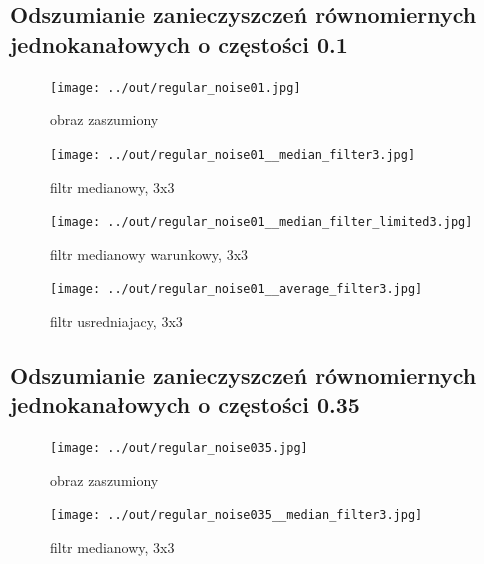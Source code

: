 \documentclass[a4paper,12pt]{article}
\begin{document}
\subsection{Odszumianie zanieczyszczeń równomiernych jednokanałowych o częstości 0.1}
\begin{figure}[h!]
\begin{minipage}[t]{7.5cm}
\begin{center}
\texttt{[image: ../out/regular\_noise01.jpg]}
\caption{obraz zaszumiony}
\end{center}
\end{minipage}
\hfill
\begin{minipage}[t]{7.5cm}
\begin{center}
\texttt{[image: ../out/regular\_noise01\_\_median\_filter3.jpg]}
\caption{filtr medianowy, 3x3}
\end{center}
\end{minipage}
\end{figure}

\begin{figure}[h!]
\begin{minipage}[t]{7.5cm}
\begin{center}
\texttt{[image: ../out/regular\_noise01\_\_median\_filter\_limited3.jpg]}
\caption{filtr medianowy warunkowy, 3x3}
\end{center}
\end{minipage}
\hfill
\begin{minipage}[t]{7.5cm}
\begin{center}
\texttt{[image: ../out/regular\_noise01\_\_average\_filter3.jpg]}
\caption{filtr usredniajacy, 3x3}
\end{center}
\end{minipage}
\end{figure}


\newpage
\subsection{Odszumianie zanieczyszczeń równomiernych jednokanałowych o częstości 0.35}
\begin{figure}[h!]
\begin{minipage}[t]{7.5cm}
\begin{center}
\texttt{[image: ../out/regular\_noise035.jpg]}
\caption{obraz zaszumiony}
\end{center}
\end{minipage}
\hfill
\begin{minipage}[t]{7.5cm}
\begin{center}
\texttt{[image: ../out/regular\_noise035\_\_median\_filter3.jpg]}
\caption{filtr medianowy, 3x3}
\end{center}
\end{minipage}
\end{figure}
\end{document}
